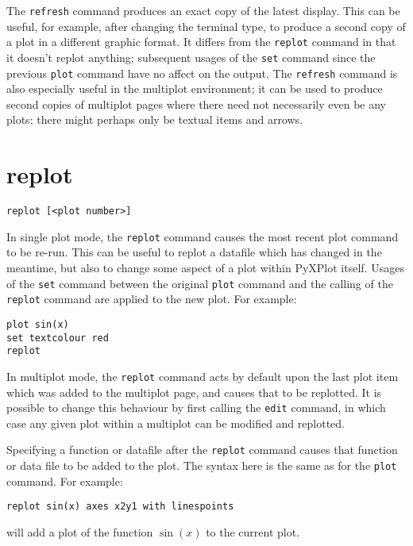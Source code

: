 \documentclass[a4paper,onecolumn,11pt]{book}
\begin{document}
The {\tt refresh} command produces an exact copy of the latest display. This can
be useful, for example, after changing the terminal type, to produce a second
copy of a plot in a different graphic format. It differs from the {\tt replot}
command in that it doesn't replot anything; subsequent usages of the {\tt set}
command since the previous {\tt plot} command have no affect on the output. The
{\tt refresh} command is also especially useful in the multiplot environment; it
can be used to produce second copies of multiplot pages where there need not
necessarily even be any plots; there might perhaps only be textual items and
arrows.


\section{replot}

\begin{verbatim}
replot [<plot number>]
\end{verbatim}

In single plot mode, the {\tt replot} command causes the most recent plot
command to be re-run.  This can be useful to replot a datafile which has changed
in the meantime, but also to change some aspect of a plot within PyXPlot itself.
Usages of the {\tt set} command between the original {\tt plot} command and the
calling of the {\tt replot} command are applied to the new plot. For example:

\begin{verbatim}
plot sin(x)
set textcolour red
replot
\end{verbatim}

In multiplot mode, the {\tt replot} command acts by default upon the last plot
item which was added to the multiplot page, and causes that to be replotted. It
is possible to change this behaviour by first calling the {\tt edit} command, in
which case any given plot within a multiplot can be modified and replotted.

Specifying a function or datafile after the {\tt replot} command causes that
function or data file to be added to the plot. The syntax here is the same as
for the {\tt plot} command.  For example:

\begin{verbatim}
replot sin(x) axes x2y1 with linespoints
\end{verbatim}

\noindent will add a plot of the function $\sin(x)$ to the current plot.
\end{document}
